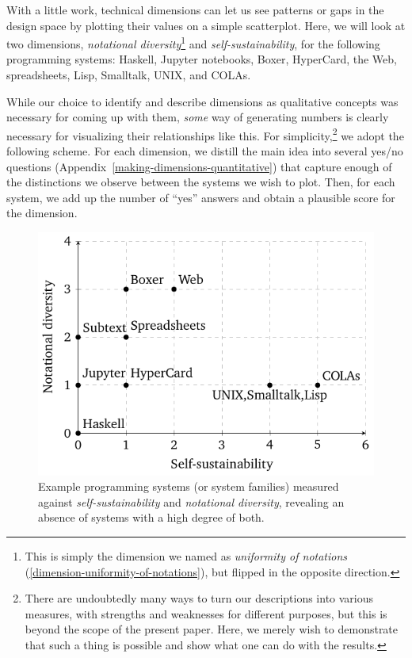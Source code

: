 With a little work, technical dimensions can let us see patterns or gaps
in the design space by plotting their values on a simple scatterplot.
Here, we will look at two dimensions, \emph{notational
diversity}\footnote{This is simply the dimension we named as
  \emph{uniformity of notations}
  (\ref{dimension-uniformity-of-notations}), but flipped in the opposite
  direction.} and \emph{self-sustainability}, for the following
programming systems: Haskell, Jupyter notebooks, Boxer, HyperCard, the
Web, spreadsheets, Lisp, Smalltalk, UNIX, and COLAs.

While our choice to identify and describe dimensions as qualitative
concepts was necessary for coming up with them, \emph{some} way of
generating numbers is clearly necessary for visualizing their
relationships like this. For simplicity,\footnote{There are undoubtedly
  many ways to turn our descriptions into various measures, with
  strengths and weaknesses for different purposes, but this is beyond
  the scope of the present paper. Here, we merely wish to demonstrate
  that such a thing is possible and show what one can do with the
  results.} we adopt the following scheme. For each dimension, we
distill the main idea into several yes/no questions
(Appendix~\ref{making-dimensions-quantitative}) that capture enough of
the distinctions we observe between the systems we wish to plot. Then,
for each system, we add up the number of ``yes'' answers and obtain a
plausible score for the dimension.

\begin{figure}
  \centering
  \includegraphics[width=0.6\linewidth]{plot-figure0.pdf}
  \caption{Example programming systems (or system families) measured against \emph{self-sustainability} and \emph{notational diversity}, revealing an absence of systems with a high degree of both. \label{fig:design-space-plot}}
\end{figure}

